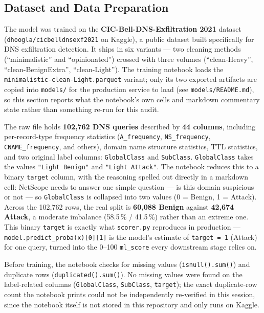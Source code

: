 \documentclass[12pt,a4paper]{report}
\begin{document}
\subsection*{Dataset and Data Preparation}
The model was trained on the \textbf{CIC-Bell-DNS-Exfiltration 2021} dataset (\texttt{dhoogla/cicbelldnsexf2021} on Kaggle), a public dataset built specifically for DNS exfiltration detection. It ships in six variants --- two cleaning methods (``minimalistic'' and ``opinionated'') crossed with three volumes (``clean-Heavy'', ``clean-BenignExtra'', ``clean-Light''). The training notebook loads the \texttt{minimalistic-clean-Light.parquet} variant; only its two exported artifacts are copied into \texttt{models/} for the production service to load (see \texttt{models/README.md}), so this section reports what the notebook's own cells and markdown commentary state rather than something re-run for this audit.

The raw file holds \textbf{102,762 DNS queries} described by \textbf{44 columns}, including per-record-type frequency statistics (\texttt{A\_frequency}, \texttt{NS\_frequency}, \texttt{CNAME\_frequency}, and others), domain name structure statistics, TTL statistics, and two original label columns: \texttt{GlobalClass} and \texttt{SubClass}. \texttt{GlobalClass} takes the values \texttt{"Light Benign"} and \texttt{"Light Attack"}. The notebook reduces this to a binary \texttt{target} column, with the reasoning spelled out directly in a markdown cell: NetScope needs to answer one simple question --- is this domain suspicious or not --- so \texttt{GlobalClass} is collapsed into two values (0 = Benign, 1 = Attack). Across the 102,762 rows, the real split is \textbf{60,088 Benign} against \textbf{42,674 Attack}, a moderate imbalance (58.5\,\% / 41.5\,\%) rather than an extreme one. This binary \texttt{target} is exactly what \texttt{scorer.py} reproduces in production --- \texttt{model.predict\_proba(x)[0][1]} is the model's estimate of \texttt{target = 1} (Attack) for one query, turned into the 0--100 \texttt{ml\_score} every downstream stage relies on.

Before training, the notebook checks for missing values (\texttt{isnull().sum()}) and duplicate rows (\texttt{duplicated().sum()}). No missing values were found on the label-related columns (\texttt{GlobalClass}, \texttt{SubClass}, \texttt{target}); the exact duplicate-row count the notebook prints could not be independently re-verified in this session, since the notebook itself is not stored in this repository and only runs on Kaggle.
\end{document}
